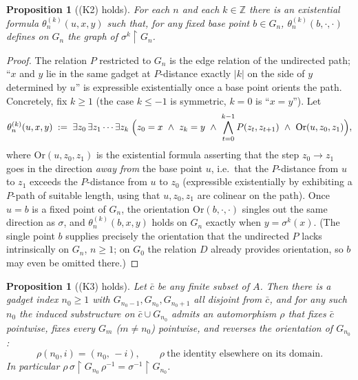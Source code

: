 \documentclass[12pt,fullpage]{article}
\newtheorem{proposition}[theorem]{Proposition}
\theoremstyle{definition}
\newcommand{\Z}{{\mathbb{Z}}}
\begin{document}
\begin{proposition}[(K2) holds]\label{prop:K2}
For each $n$ and each $k\in\Z$ there is an existential formula
$\theta_n^{(k)}(u,x,y)$ such that, for any fixed base point $b\in G_n$,
$\theta_n^{(k)}(b,\cdot,\cdot)$ defines on $G_n$ the graph of
$\sigma^k\restriction G_n$.
\end{proposition}

\begin{proof}
The relation $P$ restricted to $G_n$ is the edge relation of the undirected
path; ``$x$ and $y$ lie in the same gadget at $P$-distance exactly $|k|$ on
the side of $y$ determined by $u$'' is expressible existentially once a base
point orients the path.  Concretely, fix $k\ge 1$ (the case $k\le -1$ is
symmetric, $k=0$ is ``$x=y$'').  Let
\[
\theta_n^{(k)}(u,x,y)\;:=\;\exists z_0\,\exists z_1\cdots\exists z_{k}\;
\Bigl(z_0=x\ \wedge\ z_k=y\ \wedge\ \bigwedge_{t=0}^{k-1}P(z_t,z_{t+1})\ \wedge\ \mathrm{Or}(u,z_0,z_1)\Bigr),
\]
where $\mathrm{Or}(u,z_0,z_1)$ is the existential formula asserting that the
step $z_0\to z_1$ goes in the direction \emph{away from} the base point $u$,
i.e.\ that the $P$-distance from $u$ to $z_1$ exceeds the $P$-distance from
$u$ to $z_0$ (expressible existentially by exhibiting a $P$-path of suitable
length, using that $u,z_0,z_1$ are colinear on the path).  Once $u=b$ is a
fixed point of $G_n$, the orientation $\mathrm{Or}(b,\cdot,\cdot)$ singles out
the same direction as $\sigma$, and $\theta_n^{(k)}(b,x,y)$ holds on $G_n$
exactly when $y=\sigma^k(x)$.  (The single point $b$ supplies precisely the
orientation that the undirected $P$ lacks intrinsically on $G_n$, $n\ge 1$;
on $G_0$ the relation $D$ already provides orientation, so $b$ may even be
omitted there.)
\end{proof}

\begin{proposition}[(K3) holds]\label{prop:K3}
Let $\bar c$ be any finite subset of $A$.  Then there is a gadget index
$n_0\ge 1$ with $G_{n_0-1},G_{n_0},G_{n_0+1}$ all disjoint from $\bar c$, and
for any such $n_0$ the induced substructure on $\bar c\cup G_{n_0}$ admits an
automorphism $\rho$ that fixes $\bar c$ pointwise, fixes every
$G_m$ ($m\ne n_0$) pointwise, and reverses the orientation of $G_{n_0}$:
\[
\rho(n_0,i)=(n_0,\,-i),\qquad \rho\ \text{the identity elsewhere on its domain.}
\]
In particular $\rho\,\sigma\restriction G_{n_0}\,\rho^{-1}=
\sigma^{-1}\restriction G_{n_0}$.
\end{proposition}
\end{document}

